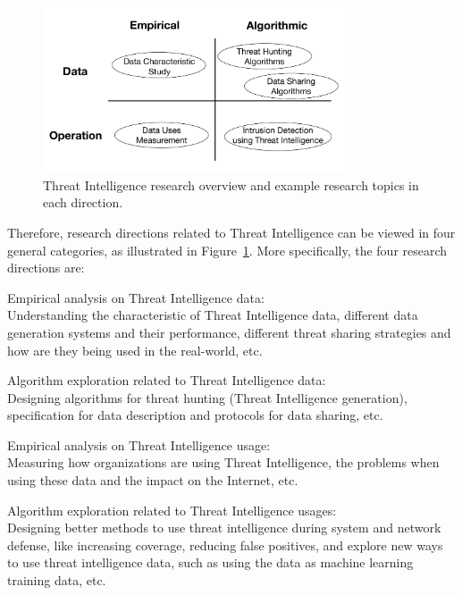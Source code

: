 \begin{dissertationintroduction}
\begin{figure}
\centering
\includegraphics[width=0.8\textwidth]{threat_intel_research_overview.pdf}
\caption{Threat Intelligence research overview and example research
topics in each direction.}
\label{fig:threat_intel_overview}
\end{figure}

Therefore, research directions related to Threat Intelligence can be 
viewed in four general categories, as illustrated in
Figure~\ref{fig:threat_intel_overview}. More specifically, the four 
research directions are: 
\begin{prettylist}
    \item Empirical analysis on Threat Intelligence data: \\
    Understanding the characteristic of Threat Intelligence data, different
    data generation systems and their performance, different threat sharing
    strategies and how are they being used in the real-world, etc.
    
    \item Algorithm exploration related to Threat Intelligence data: \\
    Designing algorithms for threat hunting (Threat Intelligence generation),
    specification for data description and protocols for data sharing, etc.
    
    \item Empirical analysis on Threat Intelligence usage: \\
    Measuring how organizations are using Threat Intelligence, the problems 
    when using these data and the impact on the Internet, etc.
    
    \item Algorithm exploration related to Threat Intelligence usages: \\
    Designing better methods to use threat intelligence during system and 
    network defense, like increasing coverage, reducing false positives, and
    explore new ways to use threat intelligence data, such as using the 
    data as machine learning training data, etc.
\end{prettylist}


\end{dissertationintroduction}
